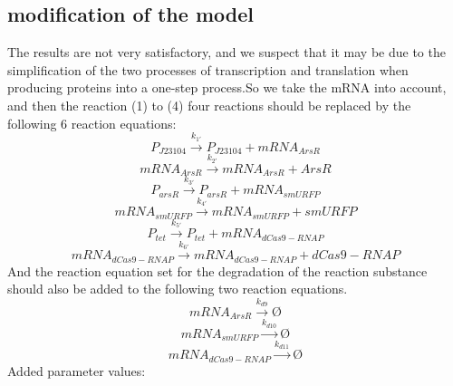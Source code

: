 \subsection{modification of the model}
The results are  not very satisfactory, and we suspect that it may be due to the simplification of the two processes of transcription and translation when producing proteins into a one-step process.So we take the mRNA into account, and then the reaction (1) to (4) four reactions should be replaced by the  following 6 reaction equations:
\begin{equation}
P_{J23104} \stackrel{k_{1'}}{\longrightarrow} P_{J23104}+mRNA_{ArsR}
\end{equation}
\begin{equation}
mRNA_{ArsR}\stackrel{k_{2'}}{\longrightarrow} mRNA_{ArsR}+ArsR
\end{equation}
\begin{equation}
P_{arsR} \stackrel{k_{3'}}{\longrightarrow} P_{arsR} +mRNA_{smURFP}
\end{equation}
\begin{equation}
mRNA_{smURFP} \stackrel{k_{4'}}{\longrightarrow} mRNA_{smURFP}+ smURFP
\end{equation}
\begin{equation}
P_{tet} \stackrel{k_{5'}}{\longrightarrow} P_{tet} +mRNA_{dCas9-RNAP}
\end{equation}
\begin{equation}
mRNA_{dCas9-RNAP} \stackrel{k_{6'}}{\longrightarrow} mRNA_{dCas9-RNAP}+dCas9-RNAP
\end{equation}
And the reaction equation set for the degradation of the reaction substance should also be added to the following two reaction equations.
\begin{equation}
mRNA_{ArsR}\stackrel{k_{d9}}{\longrightarrow}Ø
\end{equation}
\begin{equation}
mRNA_{smURFP}\stackrel{k_{d10}}{\longrightarrow}Ø
\end{equation}
\begin{equation}
mRNA_{dCas9-RNAP}\stackrel{k_{d11}}{\longrightarrow}Ø
\end{equation}
Added parameter values:
